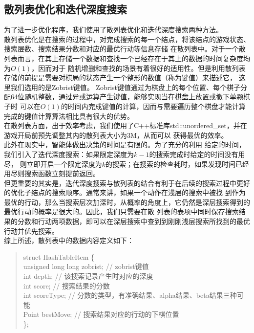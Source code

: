 \documentclass{acm_proc_article-sp}
\begin{document}
\subsection{\textbf{散列表优化和迭代深度搜索}}
为了进一步优化程序，我们使用了散列表优化\cite{xqbase1}和迭代深度搜索\cite{xqbase3}两种方法。\\
散列表优化是在搜索的过程中，对完成搜索的每一个结点，将该结点的游戏状态、搜索层数、搜索结果分数和对应的最优行动等信息存储
在散列表中。对于一个散列表而言，在其上存储一个数据和查找一个已经存在于其上的数据的时间复杂度均为$O(1)$，因而对于
随机增删和查找的场景有着很好的适用性。但是利用散列表存储的前提是需要对棋局的状态产生一个整形的数值（称为键值）来描述它，
这里我们选用的是Zobrist键值。\cite{xqbase2}
Zobrist键值通过为棋盘上的每个位置、每个棋子分配64位随机整数，通过异或运算产生键值，能够实现当在棋盘上放置或撤下单颗棋子时
可以在$O(1)$的时间内完成键值的计算，因而与需要遍历整个棋盘才能计算完成的键值计算算法相比具有很大的优势。\\
在散列表方面，出于效率考虑，我们使用了C++标准库std::unordered\_set，并在游戏开局前预先调整其内的散列表大小为3M，从而可以
获得最优的效率。\\
此外在现实中，智能体做出决策的时间是有限的。为了充分的利用
给定的时间，我们引入了迭代深度搜索：如果限定深度为$k-1$的搜索完成时给定的时间没有用尽，
则立即开启一个限定深度为$k$的搜索；在搜索的检查耗时，如果发现时间已经用尽则搜索函数立刻提前返回。\\
但更重要的其实是，迭代深度搜索与散列表的结合有利于在后续的搜索过程中更好的优化子结点的搜索顺序。通常来讲，如果一个动作在浅层的搜索中被找
到作为最优的行动，那么当搜索层次加深时，从概率的角度上，它仍然是深层搜索得到的最优行动的概率是很大的。因此，我们只需要在散
列表的表项中同时保存搜索结果的分数和行动两项数据，即可以在深层搜索中查到到刚刚浅层搜索所找到的最优行动并优先搜索。\\
综上所述，散列表中的数据内容定义如下：
\begin{quote}
    \small
       struct HashTableItem \{\\
              \hspace*{0.6cm} unsigned long long zobrist; // zobrist键值 \\
              \hspace*{0.6cm} int depth; // 该搜索记录产生时对应的深度 \\
              \hspace*{0.6cm} int score; // 搜索结果的分数 \\
              \hspace*{0.6cm} int scoreType; // 分数的类型，有准确结果、alpha结果、beta结果三种可能 \\
              \hspace*{0.6cm} Point bestMove; // 搜索结果对应的行动的下棋位置 \\
       \};
\end{quote}
\end{document}
